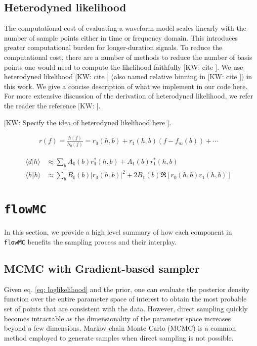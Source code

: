 \documentclass[twocolumn]{aastex631}
\newcommand{\kw}[1]{{\color{rb4}[KW: #1 ]}}
\begin{document}
\subsection{Heterodyned likelihood}

The computational cost of evaluating a waveform model scales linearly with the
number of sample points either in time or frequency domain. This introduces
greater computational burden for longer-duration signals. To reduce the
computational cost, there are a number of methods to reduce the number of basis
points one would need to compute the likelihood faithfully \kw{cite}. We use
heterodyned likelihood \kw{cite} (also named relative binning in \kw{cite}) in
this work. We give a concise description of what we implement in our code here.
For more extensive discussion of the derivation of heterodyned likelihood, we
refer the reader the reference \kw{}.

\kw{Specify the idea of heterodyned likelihood here}.

\begin{align}
r(f) = \frac{h(f)}{h_0(f)} = r_0(h,b) + r_1(h,b)(f- f_m(b)) + \cdots
\end{align}

\begin{align}
    \langle d|h \rangle &\approx \sum_b A_0(b) r^*_0(h,b) + A_1(b) r^*_1(h,b) \nonumber \\
    \langle h|h \rangle &\approx \sum_b B_0(b) |r_0(h,b)|^2 + 2 B_1(b) \Re[r_0(h,b)r_1(h,b)]
\end{align}


\section{\texttt{flowMC}}
\label{sec: flowMC}

In this section, we provide a high level summary of how each component in
\texttt{flowMC} benefits the sampling process and their interplay.


\subsection{MCMC with Gradient-based sampler}
\label{sec:gradient}

Given eq. \ref{eq: loglikelihood} and the prior, one can evaluate the posterior
density function over the entire parameter space of interest to obtain the most
probable set of points that are consistent with the data. However, direct
sampling quickly becomes intractable as the dimensionality of the parameter
space increases beyond a few dimensions. Markov chain Monte Carlo (MCMC) is a
common method employed to generate samples when direct sampling is not possible.
\end{document}
